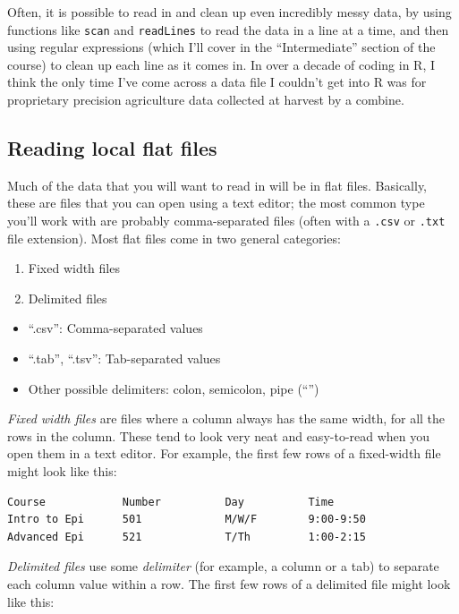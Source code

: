 \documentclass[]{book}
\providecommand{\tightlist}{%
  \setlength{\itemsep}{0pt}\setlength{\parskip}{0pt}}
\theoremstyle{definition}
\theoremstyle{definition}
\theoremstyle{definition}
\theoremstyle{remark}
\begin{document}
Often, it is possible to read in and clean up even incredibly messy
data, by using functions like \texttt{scan} and \texttt{readLines} to
read the data in a line at a time, and then using regular expressions
(which I'll cover in the ``Intermediate'' section of the course) to
clean up each line as it comes in. In over a decade of coding in R, I
think the only time I've come across a data file I couldn't get into R
was for proprietary precision agriculture data collected at harvest by a
combine.

\subsection{Reading local flat files}\label{reading-local-flat-files}

Much of the data that you will want to read in will be in flat files.
Basically, these are files that you can open using a text editor; the
most common type you'll work with are probably comma-separated files
(often with a \texttt{.csv} or \texttt{.txt} file extension). Most flat
files come in two general categories:

\begin{enumerate}
\def\labelenumi{\arabic{enumi}.}
\item
  Fixed width files
\item
  Delimited files
\end{enumerate}

\begin{itemize}
\tightlist
\item
  ``.csv'': Comma-separated values
\item
  ``.tab'', ``.tsv'': Tab-separated values
\item
  Other possible delimiters: colon, semicolon, pipe (``\textbar{}'')
\end{itemize}

\emph{Fixed width files} are files where a column always has the same
width, for all the rows in the column. These tend to look very neat and
easy-to-read when you open them in a text editor. For example, the first
few rows of a fixed-width file might look like this:

\begin{verbatim}
Course            Number          Day          Time
Intro to Epi      501             M/W/F        9:00-9:50
Advanced Epi      521             T/Th         1:00-2:15
\end{verbatim}

\emph{Delimited files} use some \emph{delimiter} (for example, a column
or a tab) to separate each column value within a row. The first few rows
of a delimited file might look like this:
\end{document}
